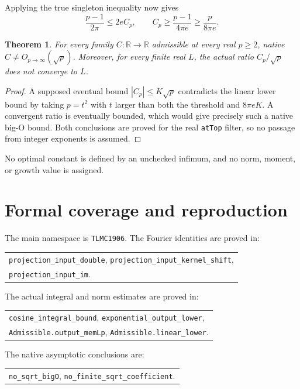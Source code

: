 \documentclass[10pt,a4paper]{article}
\newtheorem{theorem}{Theorem}
\newcommand{\R}{\mathbb R}
\begin{document}
Applying the true singleton inequality now gives
\[
 \frac{p-1}{2\pi}\le2eC_p,\qquad
 C_p\ge\frac{p-1}{4\pi e}\ge\frac{p}{8\pi e}.
\]
\begin{theorem}
For every family \(C:\R\to\R\) admissible at every real \(p\ge2\), native \(C\ne O_{p\to\infty}(\sqrt p)\). Moreover, for every finite real \(L\), the actual ratio \(C_p/\sqrt p\) does not converge to \(L\).
\end{theorem}
\begin{proof}
A supposed eventual bound \(|C_p|\le K\sqrt p\) contradicts the linear lower bound by taking \(p=t^2\) with \(t\) larger than both the threshold and \(8\pi eK\). A convergent ratio is eventually bounded, which would give precisely such a native big-O bound. Both conclusions are proved for the real \texttt{atTop} filter, so no passage from integer exponents is assumed.
\end{proof}
No optimal constant is defined by an unchecked infimum, and no norm, moment, or growth value is assigned.

\newpage
\section{Formal coverage and reproduction}
The main namespace is \texttt{TLMC1906}. The Fourier identities are proved in:
\begin{center}\begin{tabular}{@{}l@{}}
\texttt{projection\_input\_double}, \texttt{projection\_input\_kernel\_shift},\\
\texttt{projection\_input\_im}.
\end{tabular}\end{center}
The actual integral and norm estimates are proved in:
\begin{center}\begin{tabular}{@{}l@{}}
\texttt{cosine\_integral\_bound}, \texttt{exponential\_output\_lower},\\
\texttt{Admissible.output\_memLp}, \texttt{Admissible.linear\_lower}.
\end{tabular}\end{center}
The native asymptotic conclusions are:
\begin{center}\begin{tabular}{@{}l@{}}
\texttt{no\_sqrt\_bigO}, \texttt{no\_finite\_sqrt\_coefficient}.
\end{tabular}\end{center}
\end{document}

